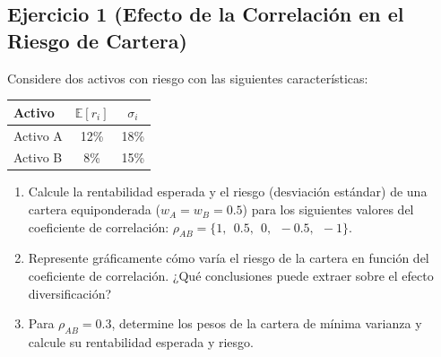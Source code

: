 \documentclass[12pt,a4paper]{article}
\newcommand{\E}{\mathbb{E}}
\newenvironment{ejercicio}[1]{\subsection*{Ejercicio #1}}{}
\begin{document}
\begin{ejercicio}{1 (Efecto de la Correlación en el Riesgo de Cartera)}
Considere dos activos con riesgo con las siguientes características:
\begin{center}
\begin{tabular}{lcc}
\toprule
Activo & $\E[r_i]$ & $\sigma_i$ \\
\midrule
Activo A & 12\% & 18\% \\
Activo B & 8\% & 15\% \\
\bottomrule
\end{tabular}
\end{center}

\begin{enumerate}[label=\alph*)]
  \item Calcule la rentabilidad esperada y el riesgo (desviación estándar) de una cartera equiponderada ($w_A = w_B = 0.5$) para los siguientes valores del coeficiente de correlación: $\rho_{AB} = \{1, ~~ 0.5, ~~ 0, ~~ -0.5, ~~ -1\}$.
  \item Represente gráficamente cómo varía el riesgo de la cartera en función del coeficiente de correlación. ¿Qué conclusiones puede extraer sobre el efecto diversificación?
  \item Para $\rho_{AB} = 0.3$, determine los pesos de la cartera de mínima varianza y calcule su rentabilidad esperada y riesgo.
\end{enumerate}
\end{ejercicio}
\end{document}
